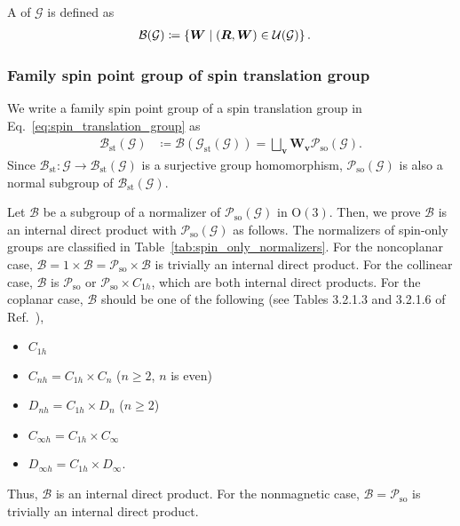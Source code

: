 A  of $\mathcal{G}$ is defined as
\begin{align}
  \mathcal{B}(\mathcal{G})
    &\coloneqq \left\{  \bm{W}  \mathrel{}\middle|\mathrel{}  (\bm{R}, \bm{W}) \in \mathcal{U}(\mathcal{G})  \right\}.
\end{align}

\subsubsection{Family spin point group of spin translation group}

We write a family spin point group of a spin translation group in Eq.~\eqref{eq:spin_translation_group} as
\begin{align}
    \mathcal{B}_{\mathrm{st}}(\mathcal{G})
        &\coloneqq \mathcal{B}(\mathcal{G}_{\mathrm{st}}(\mathcal{G}))
        = \bigsqcup_{ \bm{v} } \bm{W}_{\bm{v}} \mathcal{P}_{\mathrm{so}}(\mathcal{G}).
\end{align}
Since $\mathcal{B}_{\mathrm{st}}: \mathcal{G} \to \mathcal{B}_{\mathrm{st}}(\mathcal{G})$ is a surjective group homomorphism, $\mathcal{P}_{\mathrm{so}}(\mathcal{G})$ is also a normal subgroup of $\mathcal{B}_{\mathrm{st}}(\mathcal{G})$.

Let $\mathcal{B}$ be a subgroup of a normalizer of $\mathcal{P}_{\mathrm{so}}(\mathcal{G})$ in $\mathrm{O}(3)$.
Then, we prove $\mathcal{B}$ is an internal direct product with $\mathcal{P}_{\mathrm{so}}(\mathcal{G})$ as follows.
The normalizers of spin-only groups are classified in Table~\ref{tab:spin_only_normalizers}.
For the noncoplanar case, $\mathcal{B} = 1 \times \mathcal{B} = \mathcal{P}_{\mathrm{so}} \times \mathcal{B}$ is trivially an internal direct product.
For the collinear case, $\mathcal{B}$ is $\mathcal{P}_{\mathrm{so}}$ or $\mathcal{P}_{\mathrm{so}} \times C_{1h}$, which are both internal direct products.
For the coplanar case, $\mathcal{B}$ should be one of the following (see Tables 3.2.1.3 and 3.2.1.6 of Ref.~\cite{hahn2016point}),
\begin{itemize}
  \item $C_{1h}$
  \item $C_{nh} = C_{1h} \times C_{n}$ ($n \geq 2$, $n$ is even)
  \item $D_{nh} = C_{1h} \times D_{n}$ ($n \geq 2$)
  \item $C_{\infty h} = C_{1h} \times C_{\infty}$
  \item $D_{\infty h} = C_{1h} \times D_{\infty}$.
\end{itemize}
Thus, $\mathcal{B}$ is an internal direct product.
For the nonmagnetic case, $\mathcal{B} = \mathcal{P}_{\mathrm{so}}$ is trivially an internal direct product.

